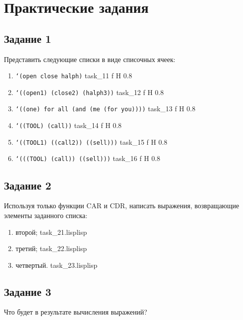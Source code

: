 \chapter{Практические задания}

\section{Задание 1}

Представить следующие списки в виде списочных ячеек:
\begin{enumerate}
	\item \texttt{`(open close halph)}
		{task_11}
		{f}
		{H}
		{0.8\textwidth}
		{}
	\item \texttt{`((open1) (close2) (halph3))}
		{task_12}
		{f}
		{H}
		{0.8\textwidth}
		{}
	\item \texttt{`((one) for all (and (me (for you))))}
		{task_13}
		{f}
		{H}
		{0.8\textwidth}
		{}
	\item \texttt{`((TOOL) (call))}
		{task_14}
		{f}
		{H}
		{0.8\textwidth}
		{}
	\item \texttt{`((TOOL1) ((call2)) ((sell)))}
		{task_15}
		{f}
		{H}
		{0.8\textwidth}
		{}
	\item \texttt{`(((TOOL) (call)) ((sell)))}
		{task_16}
		{f}
		{H}
		{0.8\textwidth}
		{}
\end{enumerate}

\section{Задание 2}

Используя только функции CAR и CDR, написать выражения, возвращающие элементы заданного списка:
\begin{enumerate}
	\item второй;
		{task_21.lisp}{lisp}{}
	\item третий;
		{task_22.lisp}{lisp}{}
	\item четвертый.
		{task_23.lisp}{lisp}{}
\end{enumerate}

\section{Задание 3}

Что будет в результате вычисления выражений?

